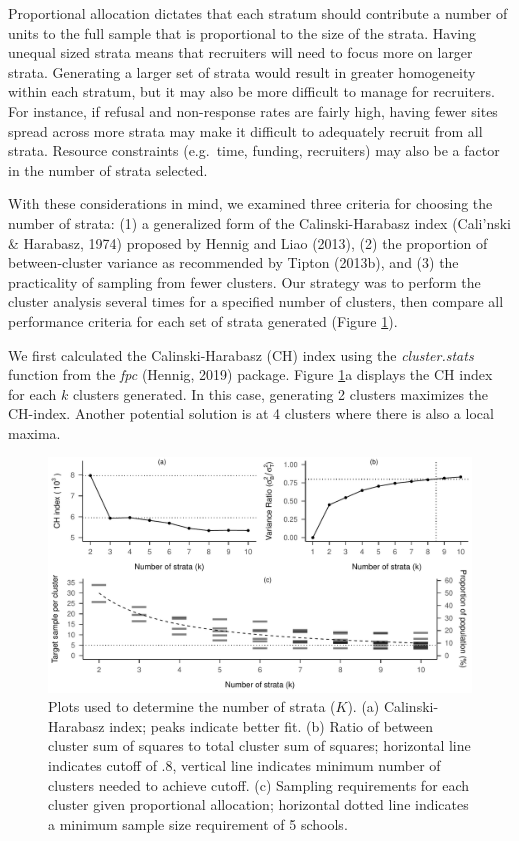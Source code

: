 \documentclass[english,man,floatsintext]{apa6}
\begin{document}
Proportional allocation dictates that each stratum should contribute a number of units to the full sample that is proportional to the size of the strata. Having unequal sized strata means that recruiters will need to focus more on larger strata. Generating a larger set of strata would result in greater homogeneity within each stratum, but it may also be more difficult to manage for recruiters. For instance, if refusal and non-response rates are fairly high, having fewer sites spread across more strata may make it difficult to adequately recruit from all strata. Resource constraints (e.g.~time, funding, recruiters) may also be a factor in the number of strata selected.

With these considerations in mind, we examined three criteria for choosing the number of strata: (1) a generalized form of the Calinski-Harabasz index (Cali\a'nski \& Harabasz, 1974) proposed by Hennig and Liao (2013), (2) the proportion of between-cluster variance as recommended by Tipton (2013b), and (3) the practicality of sampling from fewer clusters. Our strategy was to perform the cluster analysis several times for a specified number of clusters, then compare all performance criteria for each set of strata generated (Figure \ref{fig:fig-k-plots}).

We first calculated the Calinski-Harabasz (CH) index using the \emph{cluster.stats} function from the \emph{fpc} (Hennig, 2019) package. Figure \ref{fig:fig-k-plots}a displays the CH index for each \(k\) clusters generated. In this case, generating 2 clusters maximizes the CH-index. Another potential solution is at 4 clusters where there is also a local maxima.



\begin{figure}[tbp]
\includegraphics[width=1\linewidth]{6---Paper_files/figure-latex/fig-k-plots-1} \caption{Plots used to determine the number of strata (\(K\)). (a) Calinski-Harabasz index; peaks indicate better fit. (b) Ratio of between cluster sum of squares to total cluster sum of squares; horizontal line indicates cutoff of .8, vertical line indicates minimum number of clusters needed to achieve cutoff. (c) Sampling requirements for each cluster given proportional allocation; horizontal dotted line indicates a minimum sample size requirement of 5 schools. }\label{fig:fig-k-plots}
\end{figure}
\end{document}
